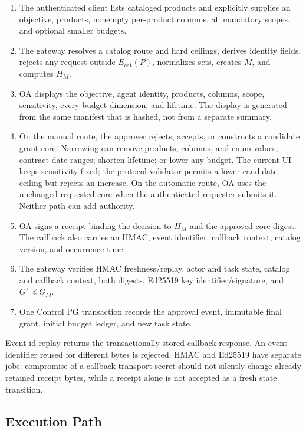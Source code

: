 \documentclass[10pt,journal,compsoc]{IEEEtran}
\begin{document}
\begin{enumerate}
  \item The authenticated client lists cataloged products and explicitly
  supplies an objective, products, nonempty per-product columns, all mandatory
  scopes, and optional smaller budgets.
  \item The gateway resolves a catalog route and hard ceilings, derives identity
  fields, rejects any request outside $E_{\mathrm{cat}}(P)$, normalizes sets, creates
  $M$, and computes $H_M$.
  \item OA displays the objective, agent identity, products, columns, scope,
  sensitivity, every budget dimension, and lifetime.  The display is generated
  from the same manifest that is hashed, not from a separate summary.
  \item On the manual route, the approver rejects, accepts, or constructs a
  candidate grant core.  Narrowing can remove products, columns, and enum
  values; contract date ranges; shorten lifetime; or lower any budget.  The
  current UI keeps sensitivity fixed; the protocol validator permits a lower
  candidate ceiling but rejects an increase.  On the automatic route, OA uses
  the unchanged requested core when the authenticated requester submits it.
  Neither path can add authority.
  \item OA signs a receipt binding the decision to $H_M$ and the approved core
  digest.  The callback also carries an HMAC, event identifier, callback context,
  catalog version, and occurrence time.
  \item The gateway verifies HMAC freshness/replay, actor and task state, catalog
  and callback context, both digests, Ed25519 key identifier/signature, and
  $G'\preceq G_M$.
  \item One Control PG transaction records the approval event, immutable final
  grant, initial budget ledger, and new task state.
\end{enumerate}

Event-id replay returns the transactionally stored callback response.  An event
identifier reused for different bytes is rejected.  HMAC and Ed25519 have
separate jobs: compromise of a callback transport secret should not silently
change already retained receipt bytes, while a receipt alone is not accepted as
a fresh state transition.

\subsection{Execution Path}
\end{document}
